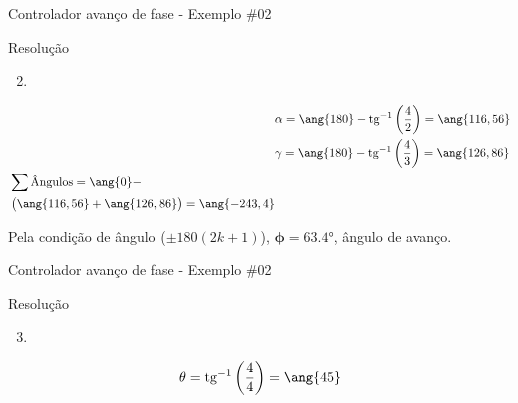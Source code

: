 \begin{frame}{Controlador avanço de fase - Exemplo \#02}
\begin{block}{Resolução}
	\begin{enumerate}
		\setcounter{enumi}{1}
		\item 
	\end{enumerate}
	\begin{minipage}{0.4\linewidth}
		\centering
		
		\scalebox{0.8}{}
	\end{minipage}
	\hfill
	\begin{minipage}{0.55\linewidth}
		\begin{align*}
		&\alpha=\ang{180}-\tg^{-1}\left( \dfrac{4}{2}\right)=\ang{116,56}\\
		&\gamma=\ang{180}-\tg^{-1}\left( \dfrac{4}{3}\right)=\ang{126,86}\\
		\begin{split}
		&\sum \text{Ângulos}=\ang{0}-\\&\left(\ang{116,56}+\ang{126,86}\right)=\ang{-243,4}
		\end{split}
		\end{align*}
	\end{minipage}
	
	\medskip
	
	Pela condição de ângulo ($ \pm180(2k+1) $), \textbf{$ \bm{\phi=}\ang{63,4} $}, ângulo de avanço.
\end{block}
\end{frame}


\begin{frame}{Controlador avanço de fase - Exemplo \#02}
	\begin{block}{Resolução}
		\begin{enumerate}
			\setcounter{enumi}{2}
			\item 
		\end{enumerate}
		
		\centering
		
		\scalebox{0.7}{}
		
		\vspace{-0.5cm}
		
		\[ \theta=\tg^{-1}\left( \dfrac{4}{4}\right) =\ang{45} \]
	\end{block}
\end{frame}


